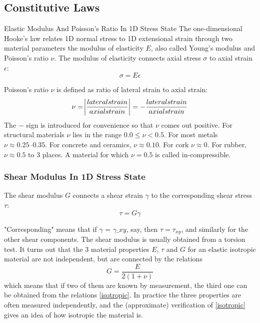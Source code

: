 \subsection{Constitutive Laws}

Elastic Modulus And Poisson's Ratio In 1D Stress State
The one-dimensional Hooke’s law relates 1D normal stress to 1D extensional strain through two material parameters the modulus of elasticity $E$, also called Young’s modulus and Poisson’s ratio $\nu$. The modulus of elasticity connects axial stress $\sigma$ to axial strain $\epsilon$:
\begin{equation}
\sigma = E\epsilon \label{Hooke's law}
\end{equation}

Poisson's ratio $\nu$ is defined as ratio of lateral strain to axial strain:
\begin{equation}
\nu = \abs{\frac{lateral strain}{axial strain}} = -\frac{lateral strain}{axial strain}
\end{equation}
The $-$ sign is introduced for convenience so that $\nu$ comes out positive. For structural materials $\nu$ lies in the range $0.0 \leq \nu <0.5$. For most metals $\nu \approx 0.25–0.35$. For concrete and ceramics, $\nu \approx 0.10$. For cork $\nu \approx 0$. For rubber, $\nu \approx 0.5$ to 3 places. A material for which $\nu = 0.5$ is called in-compressible.

\subsubsection{Shear Modulus In 1D Stress State}
The shear modulus $G$ connects a shear strain $\gamma$ to the corresponding shear stress $\tau$:
\begin{equation}
\tau = G\gamma \label{Bulk modulus}
\end{equation} 

"Corresponding" means that if $\gamma$ = $\gamma \_{xy}$, say, then $\tau = \tau_{xy}$, and similarly for the other shear components. The shear modulus is usually obtained from a torsion test. It turns out that the 3 material properties $E$, $\tau$ and $G$ for an elastic isotropic material are not independent, but are connected by the relations
\begin{equation}
G = \frac{E}{2(1 + \nu)} \label{isotropic}
\end{equation}
which means that if two of them are known by measurement, the third one can be obtained from the relations \ref{isotropic}. In practice the three properties are often measured independently, and the (approximate) verification of \ref{isotropic} gives an idea of how isotropic the material is.


